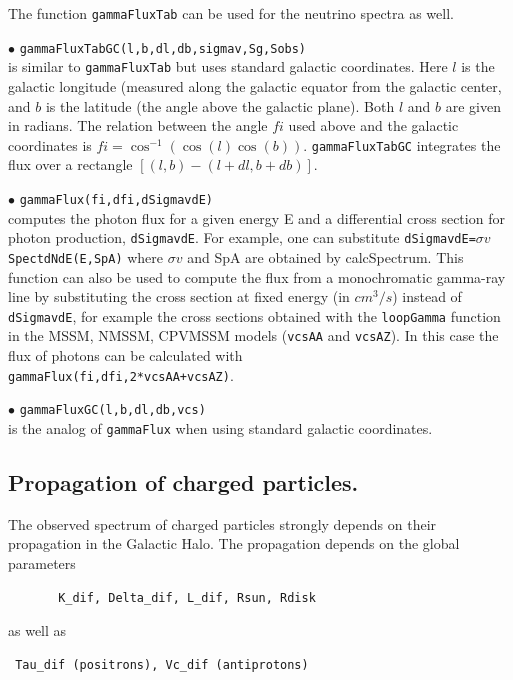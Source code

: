 \documentclass[12pt,a4paper]{article}
\begin{document}
The function \verb|gammaFluxTab| can be used  for the neutrino spectra as well.

\noindent
$\bullet$ \verb|gammaFluxTabGC(l,b,dl,db,sigmav,Sg,Sobs)|\\
is similar to {\tt gammaFluxTab}  but uses standard galactic
coordinates. Here $l$ is  the galactic longitude (measured along the galactic   
equator from the galactic center, and $b$ is the latitude (the angle above the galactic    
plane). Both $l$ and $b$ are given in radians. The relation between the angle $fi$ used
above and the galactic coordinates is  $fi=\cos^{-1}(\cos(l)\cos(b))$.  
 {\tt gammaFluxTabGC} integrates the flux over a     
rectangle $[(l,b) - (l+dl,b+db)]$. 


\noindent
$\bullet$ \verb|gammaFlux(fi,dfi,dSigmavdE)|\\
computes the photon flux for a given energy E and a differential cross section for photon production, \verb|dSigmavdE|. For example, one can substitute \verb|dSigmavdE=|$\sigma v$\verb|SpectdNdE(E,SpA)|
where $\sigma v$ and SpA are obtained by calcSpectrum. This function can also be used to compute the flux from a monochromatic gamma-ray line by substituting the cross section at fixed energy (in $cm^3/s$)  instead of \verb|dSigmavdE|, for example the cross sections obtained with the
\verb|loopGamma| function in  the   MSSM, NMSSM, CPVMSSM models (\verb|vcsAA| and \verb|vcsAZ|).
In this case the  flux of photons can be calculated with \\
\verb|gammaFlux(fi,dfi,2*vcsAA+vcsAZ)|.





\noindent
$\bullet$ \verb|gammaFluxGC(l,b,dl,db,vcs)|\\
is the analog of  \verb|gammaFlux| when using standard galactic coordinates.

\subsection{Propagation of charged particles.}

The observed spectrum of charged particles  strongly depends on their propagation
in the Galactic Halo. The propagation depends on the global parameters 
\begin{verbatim}
       K_dif, Delta_dif, L_dif, Rsun, Rdisk
\end{verbatim}
as well as 
\begin{verbatim}
 Tau_dif (positrons), Vc_dif (antiprotons)
\end{verbatim}
\end{document}
